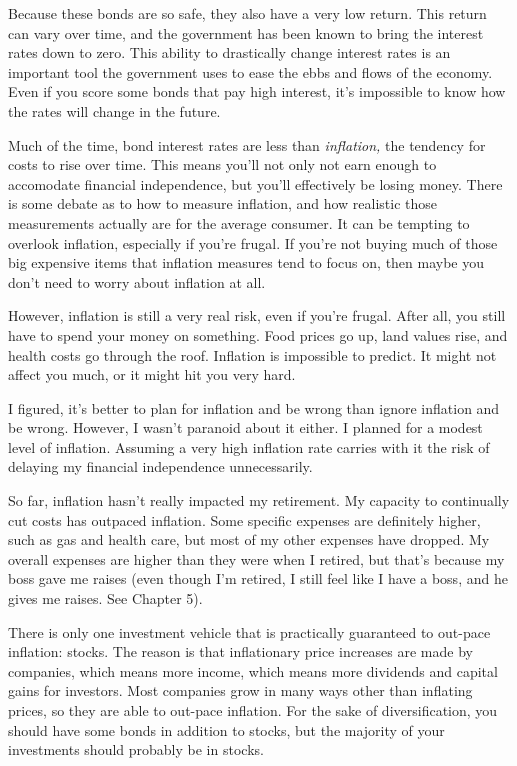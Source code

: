Because these bonds are so safe, they also have a very low return. This return can vary over time, and the government has been known to bring the interest rates down to zero. This ability to drastically change interest rates is an important tool the government uses to ease the ebbs and flows of the economy. Even if you score some bonds that pay high interest, it's impossible to know how the rates will change in the future.

Much of the time, bond interest rates are less than \emph{inflation,} the tendency for costs to rise over time. This means you'll not only not earn enough to accomodate financial independence, but you'll effectively be losing money. There is some debate as to how to measure inflation, and how realistic those measurements actually are for the average consumer. It can be tempting to overlook inflation, especially if you're frugal. If you're not buying much of those big expensive items that inflation measures tend to focus on, then maybe you don't need to worry about inflation at all.

However, inflation is still a very real risk, even if you're frugal. After all, you still have to spend your money on something. Food prices go up, land values rise, and health costs go through the roof. Inflation is impossible to predict. It might not affect you much, or it might hit you very hard.

I figured, it's better to plan for inflation and be wrong than ignore inflation and be wrong. However, I wasn't paranoid about it either. I planned for a modest level of inflation. Assuming a very high inflation rate carries with it the risk of delaying my financial independence unnecessarily.

So far, inflation hasn't really impacted my retirement. My capacity to continually cut costs has outpaced inflation. Some specific expenses are definitely higher, such as gas and health care, but most of my other expenses have dropped. My overall expenses are higher than they were when I retired, but that's because my boss gave me raises (even though I'm retired, I still feel like I have a boss, and he gives me raises. See Chapter 5).

There is only one investment vehicle that is practically guaranteed to out-pace inflation: stocks. The reason is that inflationary price increases are made by companies, which means more income, which means more dividends and capital gains for investors. Most companies grow in many ways other than inflating prices, so they are able to out-pace inflation. For the sake of diversification, you should have some bonds in addition to stocks, but the majority of your investments should probably be in stocks.


